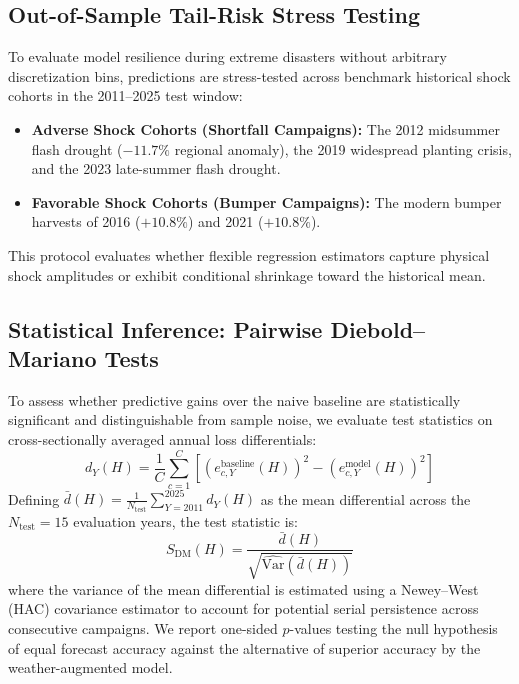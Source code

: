 \subsection{Out-of-Sample Tail-Risk Stress Testing}
\label{sec:meth_tail_risk}

To evaluate model resilience during extreme disasters without arbitrary discretization bins, predictions are stress-tested across benchmark historical shock cohorts in the 2011--2025 test window:
\begin{itemize}
    \item \textbf{Adverse Shock Cohorts (Shortfall Campaigns):} The 2012 midsummer flash drought ($-11.7\%$ regional anomaly), the 2019 widespread planting crisis, and the 2023 late-summer flash drought.
    \item \textbf{Favorable Shock Cohorts (Bumper Campaigns):} The modern bumper harvests of 2016 ($+10.8\%$) and 2021 ($+10.8\%$).
\end{itemize}
This protocol evaluates whether flexible regression estimators capture physical shock amplitudes or exhibit conditional shrinkage toward the historical mean.

\subsection{Statistical Inference: Pairwise Diebold--Mariano Tests}
\label{sec:meth_significance_bootstrap}

To assess whether predictive gains over the naive baseline are statistically significant and distinguishable from sample noise, we evaluate \citet{DieboldMariano1995} test statistics on cross-sectionally averaged annual loss differentials:
\begin{equation}
    d_Y(H) = \frac{1}{C} \sum_{c=1}^C \left[ \left(e_{c,Y}^{\text{baseline}}(H)\right)^2 - \left(e_{c,Y}^{\text{model}}(H)\right)^2 \right]
    \label{eq:dm_differential}
\end{equation}
Defining $\bar{d}(H) = \frac{1}{N_{\text{test}}} \sum_{Y=2011}^{2025} d_Y(H)$ as the mean differential across the $N_{\text{test}} = 15$ evaluation years, the test statistic is:
\begin{equation}
    S_{\text{DM}}(H) = \frac{\bar{d}(H)}{\sqrt{\widehat{\text{Var}}(\bar{d}(H))}}
    \label{eq:dm_statistic}
\end{equation}
where the variance of the mean differential is estimated using a Newey--West (HAC) covariance estimator to account for potential serial persistence across consecutive campaigns. We report one-sided $p$-values testing the null hypothesis of equal forecast accuracy against the alternative of superior accuracy by the weather-augmented model.


